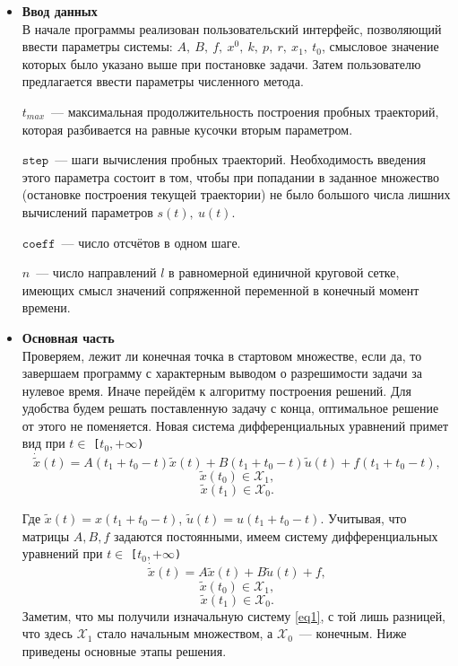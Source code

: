 \documentclass[a4paper,11pt]{article}
\begin{document}
\begin{itemize}
\item \textbf{Ввод данных} \\
В начале программы реализован пользовательский интерфейс, позволяющий ввести параметры системы: $A, \ B, \ f, \ x^0, \ k, \ p, \ r, \ x_1, \ t_0$, смысловое значение которых было указано выше при постановке задачи. Затем пользователю предлагается ввести параметры численного метода.
\par
$\texttt{$t_{max}$}$~--- максимальная продолжительность построения пробных траекторий, которая разбивается на равные кусочки вторым параметром. 
\par
$\texttt{step}$~--- шаги вычисления пробных траекторий. Необходимость введения этого параметра состоит в том, чтобы при попадании в заданное множество (остановке построения текущей траектории) не было большого числа лишних вычислений параметров $s(t), \ u(t)$. 
\par
$\texttt{coeff}$~--- число отсчётов в одном шаге. 
\par
$n$~--- число направлений $l$ в равномерной единичной круговой сетке, имеющих смысл значений сопряженной переменной в конечный момент времени.

\item \textbf{Основная часть} \\
Проверяем, лежит ли конечная точка в стартовом множестве, если да, то завершаем программу с характерным выводом о разрешимости задачи за нулевое время. Иначе перейдём к алгоритму построения решений. Для удобства будем решать поставленную задачу с конца, оптимальное решение от этого не поменяется. Новая система дифференциальных уравнений примет вид при $t \in$ \texttt{[$t_0,+\infty$)}
\[\dot{\tilde{x}}(t) = A(t_1 + t_0 - t)\tilde{x}(t) + B(t_1 + t_0 - t) \tilde{u}(t) + f(t_1 + t_0 - t),\] 
\[\tilde{x}(t_0) \in \mathcal{X}_1, \] 
\[\tilde{x}(t_1) \in \mathcal{X}_0. \]

Где $\tilde{x}(t) = x(t_1 + t_0 - t)$, $\tilde{u}(t) = u(t_1 + t_0 - t)$. Учитывая, что матрицы $A, B, f$ задаются постоянными, имеем систему дифференциальных уравнений при $t \in$ \texttt{[$t_0,+\infty$)} 
\[\dot{\tilde{x}}(t) = A\tilde{x}(t) + B\tilde{u}(t) + f,\] 
\[\tilde{x}(t_0) \in \mathcal{X}_1, \] 
\[\tilde{x}(t_1) \in \mathcal{X}_0. \]
Заметим, что мы получили изначальную систему \eqref{eq1}, с той лишь разницей, что здесь $\mathcal{X}_1$ стало начальным множеством, а $\mathcal{X}_0$~--- конечным. Ниже приведены основные этапы решения.
 
\begin{enumerate}
 

\end{enumerate}
\end{itemize}
\end{document}
